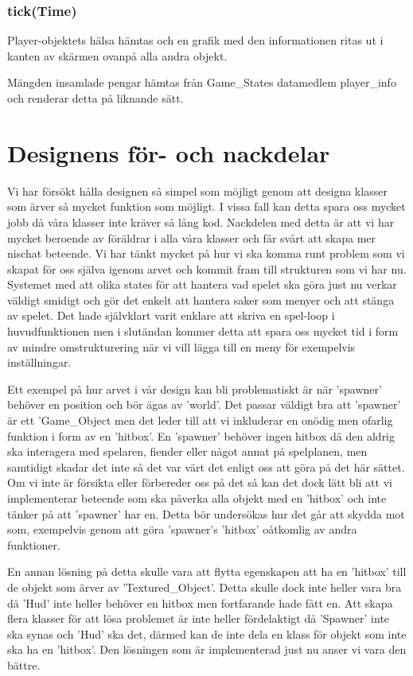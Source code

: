 \documentclass{TDP005mall}
\begin{document}
\subsubsection{tick(Time)}
Player-objektets hälsa hämtas och en grafik med den informationen ritas ut i kanten av skärmen ovanpå alla andra objekt.

Mängden insamlade pengar hämtas från Game\_States datamedlem player\_info och renderar detta på liknande sätt. 


\section{Designens för- och nackdelar}
Vi har försökt hålla designen så simpel som möjligt genom att designa klasser som ärver så mycket funktion som möjligt. I vissa fall kan detta spara oss mycket jobb då våra klasser inte kräver så lång kod. Nackdelen med detta är att vi har mycket beroende av föräldrar i alla våra klasser och får svårt att skapa mer nischat beteende. Vi har tänkt mycket på hur vi ska komma runt problem som vi skapat för oss själva igenom arvet och kommit fram till strukturen som vi har nu. Systemet med att olika states för att hantera vad spelet ska göra just nu verkar väldigt smidigt och gör det enkelt att hantera saker som menyer och att stänga av spelet. Det hade självklart varit enklare att skriva en spel-loop i huvudfunktionen men i slutändan kommer detta att spara oss mycket tid i form av mindre omstrukturering när vi vill lägga till en meny för exempelvis inställningar.

Ett exempel på hur arvet i vår design kan bli problematiskt är när 'spawner' behöver en position och bör ägas av 'world'. Det passar väldigt bra att 'spawner' är ett 'Game\_Object men det leder till att vi inkluderar en onödig men ofarlig funktion i form av en 'hitbox'. En 'spawner' behöver ingen hitbox då den aldrig ska interagera med spelaren, fiender eller något annat på spelplanen, men samtidigt skadar det inte så det var värt det enligt oss att göra på det här sättet. Om vi inte är försikta eller förbereder oss på det så kan det dock lätt bli att vi implementerar beteende som ska påverka alla objekt med en 'hitbox' och inte tänker på att 'spawner' har en. Detta bör undersökas hur det går att skydda mot som, exempelvis genom att göra 'spawner's 'hitbox' oåtkomlig av andra funktioner.

En annan lösning på detta skulle vara att flytta egenskapen att ha en 'hitbox' till de objekt som ärver av 'Textured\_Object'. Detta skulle dock inte heller vara bra då 'Hud' inte heller behöver en hitbox men fortfarande hade fått en. Att skapa flera klasser för att lösa problemet är inte heller fördelaktigt då 'Spawner' inte ska synas och 'Hud' ska det, därmed kan de inte dela en klass för objekt som inte ska ha en 'hitbox'. Den lösningen som är implementerad just nu anser vi vara den bättre.
\end{document}
